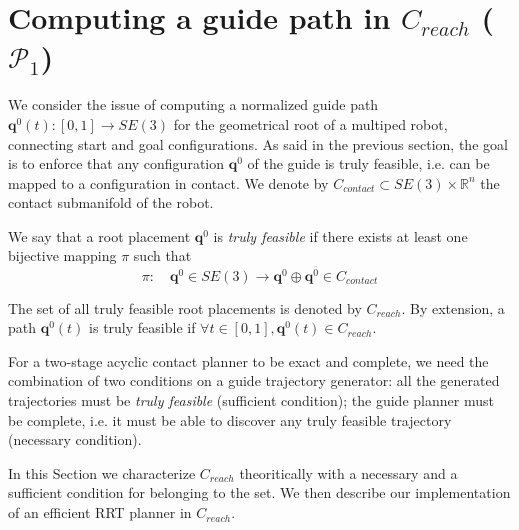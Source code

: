 \section{Computing a guide path in $C_{reach}$ ($\mathcal{P}_1$) }
\label{rbprm}

We consider the issue of computing a normalized guide path $\mathbf{q}^0(t) : [0,1] \longrightarrow SE(3)$ for the geometrical root of a multiped robot, connecting start and goal configurations. As said in the previous section, the goal is to enforce that any configuration $\mathbf{q}^0$ of the guide is truly feasible, i.e. can be mapped to a configuration in contact. We denote by $C_{contact} \subset SE(3) \times \mathbb{R}^n$ the contact submanifold of the robot.

We say that a root placement $\mathbf{q}^{0}$ is \textit{truly feasible} if there exists at least one bijective mapping $\pi$
such that
\begin{equation}
    \pi\colon \quad \mathbf{q}^{0} \in  SE(3) \longrightarrow  \mathbf{q}^{0} \oplus \mathbf{q}^{\overline{0}} \in C_{contact} 
    \label{eq:pi}
\end{equation}

The set of all truly feasible root placements is denoted by $C_{reach}$. By extension, a path $\mathbf{q}^0(t)$ is truly feasible if $\forall t \in [0,1], \mathbf{q}^0(t) \in C_{reach}$.

For a two-stage acyclic contact planner to be exact and complete, we need the combination of two conditions on a guide trajectory generator: all the generated trajectories must be \textit{truly feasible} (sufficient condition); the guide planner must be complete, i.e. it must be able to discover any truly feasible trajectory (necessary condition).

In this Section we characterize $C_{reach}$ theoritically with a necessary and a sufficient condition for belonging to the set.
We then describe our implementation of an efficient RRT planner in $C_{reach}$.

